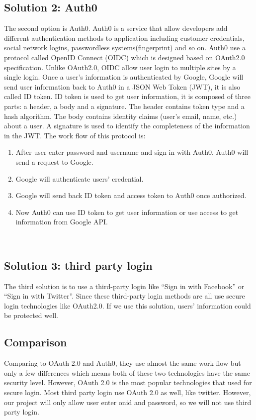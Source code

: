 \documentclass[letterpaper, 10pt,titlepage]{article}
\begin{document}
\subsection{Solution 2: Auth0} 
The second option is Auth0. Auth0 is a service that allow developers add different authentication methods to application including customer credentials, social network logins, passwordless systems(fingerprint) and so on. Auth0 use a protocol called OpenID Connect (OIDC) which is designed based on OAuth2.0 specification. Unlike OAuth2.0, OIDC allow user login to multiple sites by a single login. Once a user’s information is authenticated by Google, Google will send user information back to Auth0 in a JSON Web Token (JWT), it is also called ID token. ID token is used to get user information, it is composed of three parts: a header, a body and a signature. The header contains token type and a hash algorithm. The body contains identity claims (user’s email, name, etc.) about a user. A signature is used to identify the completeness of the information in the JWT. The work flow of this protocol is: 
\begin{enumerate}
\item After user enter password and username and sign in with Auth0, Auth0 will send a request to Google.
\item Google will authenticate users’ credential. 
\item Google will send back ID token and access token to Auth0 once authorized. 
\item Now Auth0 can use ID token to get user information or use access to get information from Google API.
\end{enumerate}\cite{OIDC}\\


\subsection{Solution 3: third party login}
The third solution is to use a third-party login like “Sign in with Facebook” or “Sign in with Twitter”. Since these third-party login methods are all use secure login technologies like OAuth2.0. If we use this solution, users’ information could be protected well. \\

\subsection{Comparison}
Comparing to OAuth 2.0 and Auth0, they use almost the same work flow but only a few differences which means both of these two technologies have the same security level. However, OAuth 2.0 is the most popular technologies that used for secure login. Most third party login use OAuth 2.0 as well, like twitter. However, our project will only allow user enter onid and password, so we will not use third party login.
\end{document}
